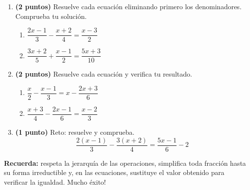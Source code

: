 \documentclass[12pt, letterpaper]{article}
\begin{document}
\begin{enumerate}[leftmargin=*, resume]

  \item \textbf{(2 puntos)} Resuelve cada ecuación eliminando primero los denominadores. Comprueba tu solución.
        \begin{enumerate}[label=\alph*), leftmargin=*]
          \item $\dfrac{2x - 1}{3} - \dfrac{x + 2}{4} = \dfrac{x - 3}{2}$
          \item $\dfrac{3x + 2}{5} + \dfrac{x - 1}{2} = \dfrac{5x + 3}{10}$
        \end{enumerate}

  \item \textbf{(2 puntos)} Resuelve cada ecuación y verifica tu resultado.
        \begin{enumerate}[label=\alph*), leftmargin=*]
          \item $\dfrac{x}{2} - \dfrac{x - 1}{3} = x - \dfrac{2x + 3}{6}$
          \item $\dfrac{x + 3}{4} - \dfrac{2x - 1}{6} = \dfrac{x - 2}{3}$
        \end{enumerate}

  \item \textbf{(1 punto)} Reto: resuelve y comprueba.
        \[
          \dfrac{2(x - 1)}{3} - \dfrac{3(x + 2)}{4} = \dfrac{5x - 1}{6} - 2
        \]

\end{enumerate}

\vspace{10pt}
\begin{cuadroinfo}
  \small
  \textbf{Recuerda:} respeta la jerarquía de las operaciones, simplifica toda fracción hasta su forma irreductible y, en las ecuaciones, sustituye el valor obtenido para verificar la igualdad. \textquestiondown Mucho éxito!
\end{cuadroinfo}
\end{document}
